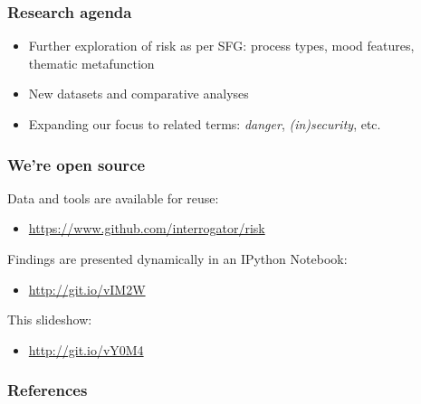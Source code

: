 \documentclass{beamer}       %
\begin{document}
\begin{frame}
    \frametitle{Research agenda}
    \begin{itemize}
        \item Further exploration of risk as per SFG: process types, mood features, thematic metafunction
        \item New datasets and comparative analyses
        \item Expanding our focus to related terms: \emph{danger}, \emph{(in)security}, etc.
    \end{itemize}
\end{frame}


\begin{frame}
    \frametitle{We're open source}

    Data and tools are available for reuse:
    \begin{itemize}
    \item \url{https://www.github.com/interrogator/risk}
    \end{itemize}
    Findings are presented dynamically in an IPython Notebook: 
    \begin{itemize}
    \item \url{http://git.io/vIM2W}
    \end{itemize}
    This slideshow:
    \begin{itemize}
    \item \url{http://git.io/vY0M4}
    \end{itemize}
\end{frame}


    \begin{frame}[t,allowframebreaks]
    \frametitle{References}
    
    
    \end{frame}
    
    
\end{document}
